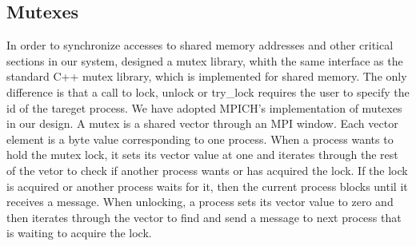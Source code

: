 \subsection{Mutexes}
In order to synchronize accesses to shared memory addresses and other critical sections in our system, designed
a mutex library, whith the same interface as the standard C++ mutex library, which is implemented
for shared memory.  The only difference is that a call to lock, unlock or try\_lock requires the user to specify
the id of the tareget process. We have adopted MPICH's implementation of mutexes in our design.  A mutex is a
shared vector through an MPI window.  Each vector element is a byte value corresponding to one process.  When
a process wants to hold the mutex lock, it sets its vector value at one and iterates through the rest of the 
vetor to check if another process wants or has acquired the lock.  If the lock is acquired or another process 
waits for it, then the current process blocks until it receives a message.  When unlocking, a process sets its 
vector value to zero and then iterates through the vector to find and send a message to next process that is 
waiting to acquire the lock.  

